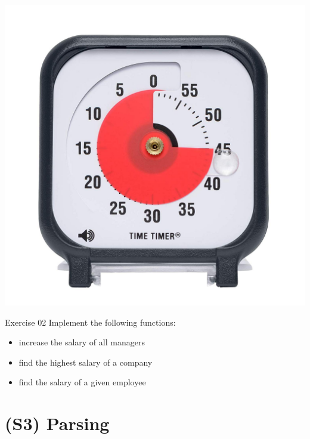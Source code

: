 \documentclass{beamer}
\begin{document}
\begin{frame}
 \begin{center} 
   \includegraphics[scale=0.15]{images/timer.pdf}
 \end{center}   
\end{frame}

\begin{frame}
  \begin{block}{Exercise 02}
    Implement the following functions:

    \begin{itemize}
      \item increase the salary of all managers
      \item find the highest salary of a company
      \item find the salary of a given employee
    \end{itemize}
  \end{block}  
\end{frame}

\section{(S3) Parsing}

\end{document}
